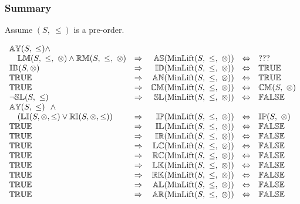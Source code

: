 \documentclass[../Summary.tex]{subfiles}
\begin{document}
\subsubsection{Summary}

Assume $(S,\ \leq)$ is a pre-order.

\[
\begin{array}{lcrcl} 
\propname{AY}(S,\ \leq) \wedge \\
\ \ \ \propname{LM}(S,\ \leq,\ \otimes) \wedge \propname{RM}(S,\ \leq,\ \otimes)
	& \Rightarrow
	& \propname{AS}(\mathrm{MinLift}(S,\ \leq,\ \otimes)) 
	& \Leftrightarrow 
	& ???
	\\ 
\propname{ID}(S, \otimes)
	& \Rightarrow
	& \propname{ID}(\mathrm{MinLift}(S,\ \leq,\ \otimes)) 
	& \Leftrightarrow 
	& \propname{TRUE}
	\\ 
\propname{TRUE}
	& \Rightarrow
	& \propname{AN}(\mathrm{MinLift}(S,\ \leq,\ \otimes)) 
	& \Leftrightarrow 
	& \propname{TRUE}
	\\
\propname{TRUE}
	& \Rightarrow
	& \propname{CM}(\mathrm{MinLift}(S,\ \leq,\ \otimes)) 
	& \Leftrightarrow 
	& \propname{CM}(S,\ \otimes)
	\\ 
\neg \propname{SL}(S,\ \leq)
	& \Rightarrow
	& \propname{SL}(\mathrm{MinLift}(S,\ \leq,\ \otimes)) 
	& \Leftrightarrow 
	& \propname{FALSE}
	\\ 
\propname{AY}(S,\ \leq) \ \ \wedge \\
\ \ \  (\propname{LI}(S,\otimes,\leq) \vee \propname{RI}(S,\otimes,\leq))
	& \Rightarrow
	& \propname{IP}(\mathrm{MinLift}(S,\ \leq,\ \otimes)) 
	& \Leftrightarrow
	& \propname{IP}(S,\ \otimes)
	\\ 
\propname{TRUE}
	& \Rightarrow
	& \propname{IL}(\mathrm{MinLift}(S,\ \leq,\ \otimes)) 
	& \Leftrightarrow 
	& \propname{FALSE} 
	\\ 
\propname{TRUE}
	& \Rightarrow
	& \propname{IR}(\mathrm{MinLift}(S,\ \leq,\ \otimes)) 
	& \Leftrightarrow 
	& \propname{FALSE} 
	\\ 
\propname{TRUE}
	& \Rightarrow
	& \propname{LC}(\mathrm{MinLift}(S,\ \leq,\ \otimes)) 
	& \Leftrightarrow 
	& \propname{FALSE} 
	\\ 
\propname{TRUE}
	& \Rightarrow
	& \propname{RC}(\mathrm{MinLift}(S,\ \leq,\ \otimes)) 
	& \Leftrightarrow 
	& \propname{FALSE} 
	\\ 
\propname{TRUE}
	& \Rightarrow
	& \propname{LK}(\mathrm{MinLift}(S,\ \leq,\ \otimes)) 
	& \Leftrightarrow 
	& \propname{FALSE} 
	\\ 
\propname{TRUE}
	& \Rightarrow
	& \propname{RK}(\mathrm{MinLift}(S,\ \leq,\ \otimes)) 
	& \Leftrightarrow 
	& \propname{FALSE} 
	\\ 
\propname{TRUE}
	& \Rightarrow
	& \propname{AL}(\mathrm{MinLift}(S,\ \leq,\ \otimes))  
	& \Leftrightarrow 
	& \propname{FALSE} 
	\\ 
\propname{TRUE}
	& \Rightarrow
	& \propname{AR}(\mathrm{MinLift}(S,\ \leq,\ \otimes))  
	& \Leftrightarrow 
	& \propname{FALSE} 
	\\ 
\end{array} 
\] 
\end{document}
